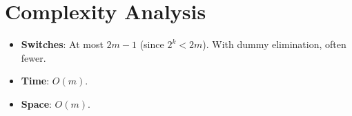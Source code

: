 \documentclass[11pt,a4paper]{article}
\begin{document}
\section{Complexity Analysis}

\begin{itemize}
  \item \textbf{Switches}: At most $2m - 1$ (since $2^k < 2m$). With dummy elimination, often fewer.
  \item \textbf{Time}: $O(m)$.
  \item \textbf{Space}: $O(m)$.
\end{itemize}
\end{document}

